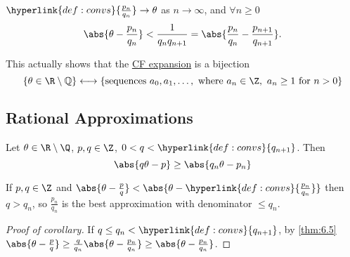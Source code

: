 \documentclass{article}
\begin{document}
\begin{nthm}\label{thm:6.4}
    $\hyperlink{def:convs}{\frac{p_n}{q_n}} \to \theta$ as $n \to \infty$, and $\forall n \geq 0$
    \begin{equation*}
        \abs{\theta - \frac{p_n}{q_n}} < \frac{1}{q_n q_{n+1}} = \abs{\frac{p_n}{q_n} - \frac{p_{n+1}}{q_{n+1}}}.
    \end{equation*}
\end{nthm}

\begin{remark}
    This actually shows that the \hyperlink{def:cfn}{CF expansion} is a bijection
    \begin{equation*}
        \{ \theta \in \R \setminus \mathbb{Q}\} \longleftrightarrow \{ \text{sequences } a_0, a_1, \dotsc,\text{ where } a_n \in \Z, \ a_n \geq 1 \text{ for } n > 0\}
    \end{equation*}
\end{remark}

\subsection{Rational Approximations}
\begin{nthm}\label{thm:6.5}
    Let $\theta \in \R \setminus \Q$, $p, q \in \Z$, $0 < q < \hyperlink{def:convs}{q_{n+1}}$. Then
    \begin{equation*}
        \abs{q \theta - p} \geq \abs{q_n \theta - p_n}
    \end{equation*}
\end{nthm}

\begin{cor}
    If $p, q \in \Z$ and $\abs{\theta - \frac{p}{q}} < \abs{\theta - \hyperlink{def:convs}{\frac{p_n}{q_n}}}$ then $q > q_n$, so
    $\frac{p_n}{q_n}$ is the best approximation with denominator $\leq q_n$.
\end{cor}

\begin{proof}[Proof of corollary]
    If $q \leq q_n < \hyperlink{def:convs}{q_{n+1}}$, by \cref{thm:6.5} $\abs{\theta - \frac{p}{q}} \geq \frac{q}{q_n} \abs{\theta - \frac{p_n}{q_n}} \geq \abs{\theta - \frac{p_n}{q_n}}$.
\end{proof}
\end{document}
